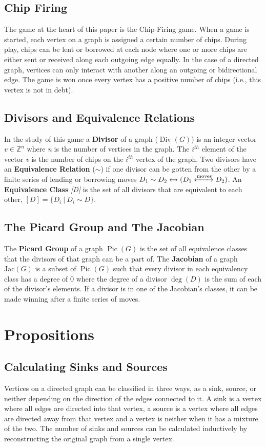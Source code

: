 \documentclass[11pt,reqno]{amsart}
\DeclareMathOperator{\Pic}{Pic}
\DeclareMathOperator{\Div}{Div}
\DeclareMathOperator{\Deg}{deg}
\newcommand{\Jac}{\textrm{Jac}}{}
\theoremstyle{definition}
\theoremstyle{plain}
\begin{document}
	\subsection{Chip Firing}
		The game at the heart of this paper is the Chip-Firing game. When a game is started, each vertex on
		a graph is assigned a certain number of chips.  During play, chips can be lent or borrowed at each
		node where one or more chips are either sent or received along each outgoing edge equally.  In the
		case of a directed graph, vertices can only interact with another along an outgoing or
		bidirectional edge.  The game is won once every vertex has a positive number of chips (i.e., this
		vertex is not in debt).

	\subsection{Divisors and Equivalence Relations}
		In the study of this game a \textbf{Divisor} of a graph ($\Div(G)$) is an integer vector $v\in\mathbb{Z}^n$
		where \textit{n} is the number of vertices in the graph.  The $i^{th}$ element of the vector \textit{v}
		is the number of chips on the $i^{th}$ vertex of the graph.  Two divisors have an \textbf{Equivalence Relation}
		($\sim$) if one divisor can be gotten from the other by a finite series of lending or borrowing moves
		$D_1 \sim D_2 \xleftrightarrow{} (D_1 \xleftrightarrow{\text{moves}} D_2)$.  An \textbf{Equivalence Class} \textit{[D]}
		is the set of all divisors that are equivalent to each other, $[D] = \{D_i~|~D_i \sim D\}$.

	\subsection{The Picard Group and The Jacobian}
		The \textbf{Picard Group} of a graph $\Pic(G)$ is the set of all equivalence classes that the
		divisors of that graph can be a  part of. The \textbf{Jacobian} of a graph  $\Jac(G)$ is a subset
		of $\Pic(G)$ such that every divisor in each equivalency class has a degree of $0$ where the
		degree of a divisor $\Deg(D)$ is the sum of each of the divisor's elements.
		If a divisor is in one of the Jacobian's classes, it can be made winning after a finite series of moves.


\section{Propositions}
	\subsection{Calculating Sinks and Sources}
		Vertices on a directed graph can be classified in three ways, as a sink, source, or neither depending on
		the direction of the edges connected to it.  A sink is a vertex where all edges are directed into that vertex,
		a source is a vertex where all edges are directed away from that vertex and a vertex is neither
		when it has a mixture of the two.  The number of sinks
		and sources can be calculated inductively by reconstructing the original graph from a single vertex.
\end{document}
